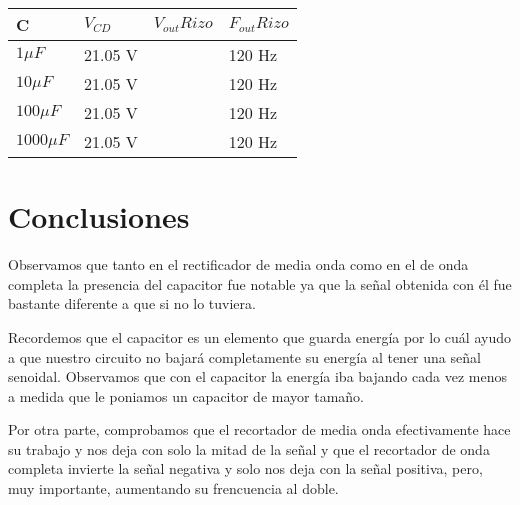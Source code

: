 \documentclass{mylib/reporteConCalif}
\begin{document}
\begin{center}
\begin{tabu} to 0.8\textwidth { | X[c] | X[c] | X[c] | X[c] | }
	 \hline
	 C & $V_{CD}$ & $V_{out}Rizo$ & $F_{out}Rizo$ \\
	 \hline
	 $1 \mu F$ & 21.05 V &  & 120 Hz \\
	 \hline
	 $10 \mu F$ &21.05 V &  & 120 Hz \\
	 \hline
	 $100 \mu F$ &21.05 V &  & 120 Hz \\
	 \hline
	 $1000 \mu F$ &21.05 V &  & 120 Hz \\
	 \hline
\end{tabu}
\end{center}


\section{Conclusiones}

Observamos que tanto en el rectificador de media onda como en el de onda completa la presencia del capacitor fue notable ya que la señal obtenida con él fue bastante diferente a que si no lo tuviera.

Recordemos que el capacitor es un elemento que guarda energía por lo cuál ayudo a que nuestro circuito no bajará completamente su energía al tener una señal senoidal. Observamos que con el capacitor la energía iba bajando cada vez menos a medida que le poniamos un capacitor de mayor tamaño.

Por otra parte, comprobamos que el recortador de media onda efectivamente hace su trabajo y nos deja con solo la mitad de la señal y que el recortador de onda completa invierte la señal negativa y solo nos deja con la señal positiva, pero, muy importante, aumentando su frencuencia al doble.
\end{document}
